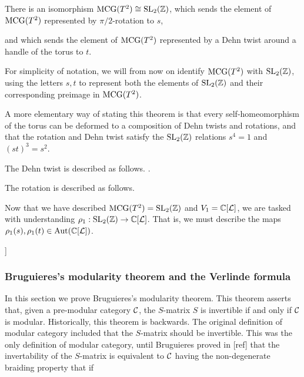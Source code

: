 \begin{thrm} There is an isomorphism $\operatorname{MCG}(T^2)\cong \operatorname{SL}_2({\mathbb Z})$, which sends the element of $\operatorname{MCG}(T^2)$ represented by $\pi/2$-rotation to $s$,


and which sends the element of $\operatorname{MCG}(T^2)$ represented by a Dehn twist around a handle of the torus to $t$. 
\end{thrm}
\begin{rem} For simplicity of notation, we will from now on identify $\operatorname{MCG}(T^2)$ with $\operatorname{SL}_2({\mathbb Z})$, using the letters $s,t$ to represent both the elements of $\operatorname{SL}_2({\mathbb Z})$ and their corresponding preimage in $\operatorname{MCG}(T^2)$.

A more elementary way of stating this theorem is that every self-homeomorphism of the torus can be deformed to a composition of Dehn twists and rotations, and that the rotation and Dehn twist satisfy the $\operatorname{SL}_2({\mathbb Z})$ relations $s^4=1$ and $(st)^3=s^2$.

The Dehn twist is described as follows. .

The rotation is described as follows.



\end{rem}

Now that we have described $\operatorname{MCG}(T^2)=\operatorname{SL}_2({\mathbb Z})$ and $V_1={\mathbb C}[{\mathcal L}]$, we are tasked with understanding $\rho_1:\operatorname{SL}_2({\mathbb Z})\to {\mathbb C}[{\mathcal L}]$. That is, we must describe the maps $\rho_1(s),\rho_1(t)\in \operatorname{Aut}({\mathbb C}[{\mathcal L}])$.


]

\subsubsection{Bruguieres's modularity theorem and the Verlinde formula}

In this section we prove Bruguieres's modularity theorem. This theorem asserts that, given a pre-modular category ${\mathcal C}$, the $S$-matrix $S$ is invertible if and only if ${\mathcal C}$ is modular. Historically, this theorem is backwards. The original definition of modular category included that the $S$-matrix should be invertible. This was the only definition of modular category, until Bruguieres proved in [ref] that the invertability of the $S$-matrix is equivalent to ${\mathcal C}$ having the non-degenerate braiding property that if

